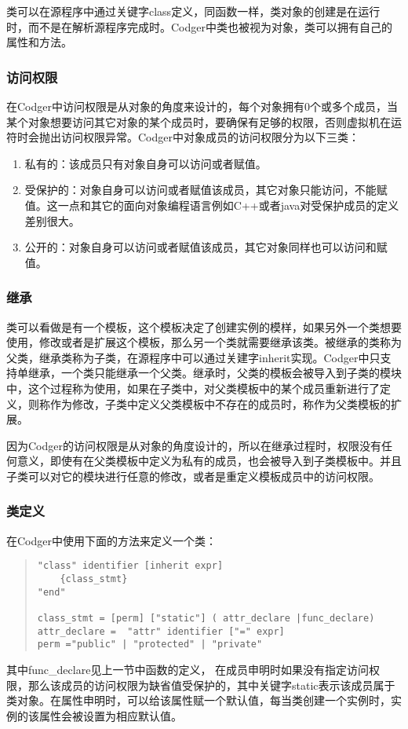 类可以在源程序中通过关键字class定义，同函数一样，类对象的创建是在运行时，而不是在解析源程序完成时。Codger中类也被视为对象，类可以拥有自己的属性和方法。
\subsubsection{访问权限}
在Codger中访问权限是从对象的角度来设计的，每个对象拥有0个或多个成员，当某个对象想要访问其它对象的某个成员时，要确保有足够的权限，否则虚拟机在运符时会抛出访问权限异常。Codger中对象成员的访问权限分为以下三类：
\begin{enumerate}
\item 私有的：该成员只有对象自身可以访问或者赋值。
\item 受保护的：对象自身可以访问或者赋值该成员，其它对象只能访问，不能赋值。这一点和其它的面向对象编程语言例如C++或者java对受保护成员的定义差别很大。
\item 公开的：对象自身可以访问或者赋值该成员，其它对象同样也可以访问和赋值。
\end{enumerate}

\subsubsection{继承}
类可以看做是有一个模板，这个模板决定了创建实例的模样，如果另外一个类想要使用，修改或者是扩展这个模板，那么另一个类就需要继承该类。被继承的类称为父类，继承类称为子类，在源程序中可以通过关建字inherit实现。Codger中只支持单继承，一个类只能继承一个父类。继承时，父类的模板会被导入到子类的模块中，这个过程称为使用，如果在子类中，对父类模板中的某个成员重新进行了定义，则称作为修改，子类中定义父类模板中不存在的成员时，称作为父类模板的扩展。

因为Codger的访问权限是从对象的角度设计的，所以在继承过程时，权限没有任何意义，即使有在父类模板中定义为私有的成员，也会被导入到子类模板中。并且子类可以对它的模块进行任意的修改，或者是重定义模板成员中的访问权限。

\subsubsection{类定义}
在Codger中使用下面的方法来定义一个类：
\begin{quote}
\begin{verbatim}
"class" identifier [inherit expr]
    {class_stmt}
"end"

class_stmt = [perm] ["static"] ( attr_declare |func_declare)
attr_declare =  "attr" identifier ["=" expr] 
perm ="public" | "protected" | "private"
\end{verbatim}
\end{quote}
其中func\_declare见上一节中函数的定义， 在成员申明时如果没有指定访问权限，那么该成员的访问权限为缺省值受保护的，其中关键字static表示该成员属于类对象。在属性申明时，可以给该属性赋一个默认值，每当类创建一个实例时，实例的该属性会被设置为相应默认值。

